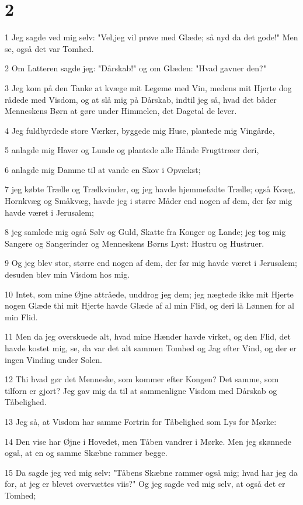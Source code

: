 \chapter{2}

\par 1 Jeg sagde ved mig selv: "Vel,jeg vil prøve med Glæde; så nyd da det gode!" Men se, også det var Tomhed.
\par 2 Om Latteren sagde jeg: "Dårskab!" og om Glæden: "Hvad gavner den?"
\par 3 Jeg kom på den Tanke at kvæge mit Legeme med Vin, medens mit Hjerte dog rådede med Visdom, og at slå mig på Dårskab, indtil jeg så, hvad det båder Menneskens Børn at gøre under Himmelen, det Dagetal de lever.
\par 4 Jeg fuldbyrdede store Værker, byggede mig Huse, plantede mig Vingårde,
\par 5 anlagde mig Haver og Lunde og plantede alle Hånde Frugttræer deri,
\par 6 anlagde mig Damme til at vande en Skov i Opvækst;
\par 7 jeg købte Trælle og Trælkvinder, og jeg havde hjemmefødte Trælle; også Kvæg, Hornkvæg og Småkvæg, havde jeg i større Måder end nogen af dem, der før mig havde været i Jerusalem;
\par 8 jeg samlede mig også Sølv og Guld, Skatte fra Konger og Lande; jeg tog mig Sangere og Sangerinder og Menneskens Børns Lyst: Hustru og Hustruer.
\par 9 Og jeg blev stor, større end nogen af dem, der før mig havde været i Jerusalem; desuden blev min Visdom hos mig.
\par 10 Intet, som mine Øjne attråede, unddrog jeg dem; jeg nægtede ikke mit Hjerte nogen Glæde thi mit Hjerte havde Glæde af al min Flid, og deri lå Lønnen for al min Flid.
\par 11 Men da jeg overskuede alt, hvad mine Hænder havde virket, og den Flid, det havde kostet mig, se, da var det alt sammen Tomhed og Jag efter Vind, og der er ingen Vinding under Solen.
\par 12 Thi hvad gør det Menneske, som kommer efter Kongen? Det samme, som tilforn er gjort? Jeg gav mig da til at sammenligne Visdom med Dårskab og Tåbelighed.
\par 13 Jeg så, at Visdom har samme Fortrin for Tåbelighed som Lys for Mørke:
\par 14 Den vise har Øjne i Hovedet, men Tåben vandrer i Mørke. Men jeg skønnede også, at en og samme Skæbne rammer begge.
\par 15 Da sagde jeg ved mig selv: "Tåbens Skæbne rammer også mig; hvad har jeg da for, at jeg er blevet overvættes viis?" Og jeg sagde ved mig selv, at også det er Tomhed;
